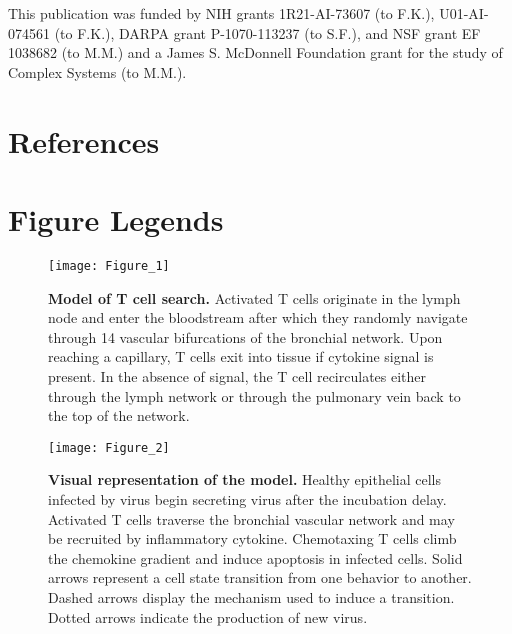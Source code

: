 \documentclass[preprint,10pt,numbers]{elsarticle}
\begin{document}
This publication was funded by NIH grants 1R21-AI-73607 (to F.K.), U01-AI-074561 (to F.K.), DARPA grant P-1070-113237 (to S.F.), and NSF grant EF 1038682 (to M.M.) and a James S. McDonnell Foundation grant for the study of Complex Systems (to M.M.).




\section*{References}
\singlespacing


\pagebreak

\section*{Figure Legends}

\begin{figure}[!ht]
\begin{center}
\texttt{[image: Figure\_1]}
\end{center}
\caption{{\bf Model of T cell search.}  Activated T cells originate in the lymph node and enter the bloodstream after which they randomly navigate through 14 vascular bifurcations of the bronchial network.  Upon reaching a capillary, T cells exit into tissue if cytokine signal is present.  In the absence of signal, the T cell recirculates either through the lymph network or through the pulmonary vein back to the top of the network.}
\label{fig:systemchart}
\end{figure}

\begin{figure}[!ht]
\begin{center}
\texttt{[image: Figure\_2]}
\end{center}
\caption{{\bf Visual representation of the model.}  Healthy epithelial cells infected by virus begin secreting virus after the incubation delay.  Activated T cells traverse the bronchial vascular network and may be recruited by inflammatory cytokine.  Chemotaxing T cells climb the chemokine gradient and induce apoptosis in infected cells.  Solid arrows represent a cell state transition from one behavior to another.  Dashed arrows display the mechanism used to induce a transition.  Dotted arrows indicate the production of new virus.}
\label{fig:modelchart}
\end{figure}
\end{document}

